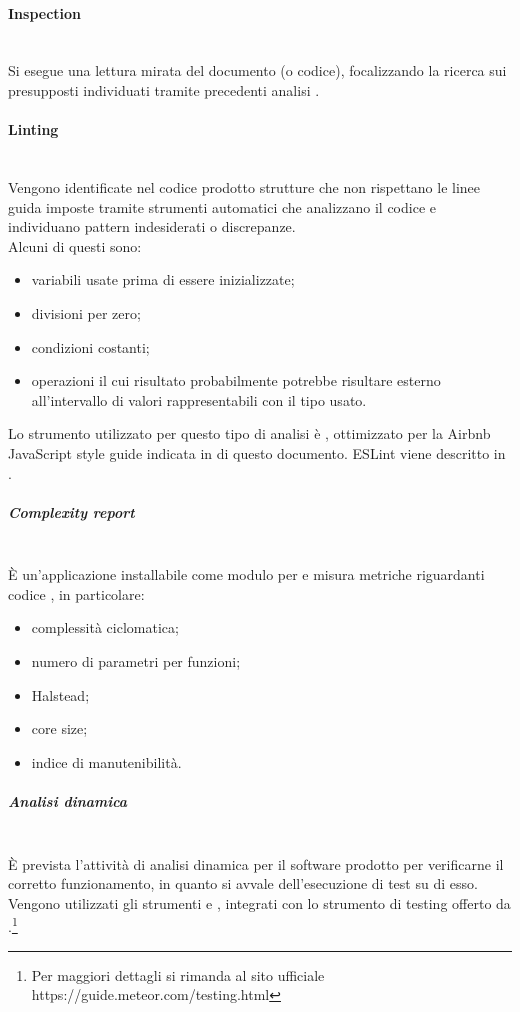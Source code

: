 \paragraph{Inspection} \mbox{}\\
Si esegue una lettura mirata del documento (o codice), focalizzando la ricerca sui presupposti individuati tramite precedenti analisi .

\paragraph{Linting}\mbox{}\\
Vengono identificate nel codice prodotto strutture che non rispettano le linee guida imposte tramite strumenti automatici che analizzano il codice e individuano pattern indesiderati o discrepanze.\\
Alcuni di questi sono:\begin{itemize}
	\item variabili usate prima di essere inizializzate;  
	\item divisioni per zero;
	\item condizioni costanti;
	\item operazioni il cui risultato probabilmente potrebbe risultare esterno all'intervallo di valori rappresentabili con il tipo usato.
\end{itemize}
Lo strumento utilizzato per questo tipo di analisi è , ottimizzato per la Airbnb JavaScript style guide indicata in  di questo documento. ESLint viene descritto in .

\subparagraph{Complexity report}\mbox{}\\
È un'applicazione installabile come modulo per  e misura metriche riguardanti codice , in particolare:
\begin{itemize}
	\item complessità ciclomatica;
	\item numero di parametri per funzioni;
	\item Halstead;
	\item core size;
	\item indice di manutenibilità.
\end{itemize}

\subparagraph{Analisi dinamica}\mbox{}\\
\`{E} prevista l’attività di analisi dinamica per il software prodotto per verificarne il corretto funzionamento, in quanto si avvale dell'esecuzione di test su di esso.
Vengono utilizzati gli strumenti  e , integrati con lo strumento di testing offerto da .\footnote{Per maggiori dettagli si rimanda al sito ufficiale https://guide.meteor.com/testing.html}

